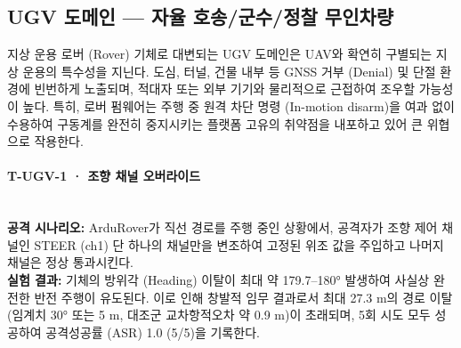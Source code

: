 \subsection{UGV 도메인 --- 자율 호송/군수/정찰 무인차량}

지상 운용 로버 (Rover) 기체로 대변되는 UGV 도메인은 UAV와 확연히 구별되는 지상 운용의 특수성을 지닌다. 도심, 터널, 건물 내부 등 GNSS 거부 (Denial) 및 단절 환경에 빈번하게 노출되며, 적대자 또는 외부 기기와 물리적으로 근접하여 조우할 가능성이 높다. 특히, 로버 펌웨어는 주행 중 원격 차단 명령 (In-motion disarm)을 여과 없이 수용하여 구동계를 완전히 중지시키는 플랫폼 고유의 취약점을 내포하고 있어 큰 위협으로 작용한다.

\paragraph{\textbf{T-UGV-1 · 조향 채널 오버라이드}} ~\\
\textbf{공격 시나리오:} ArduRover가 직선 경로를 주행 중인 상황에서, 공격자가 조향 제어 채널인 STEER (ch1) 단 하나의 채널만을 변조하여 고정된 위조 값을 주입하고 나머지 채널은 정상 통과시킨다.\\
\textbf{실험 결과:} 기체의 방위각 (Heading) 이탈이 최대 약 179.7--180° 발생하여 사실상 완전한 반전 주행이 유도된다. 이로 인해 창발적 임무 결과로서 최대 27.3 m의 경로 이탈 (임계치 30° 또는 5 m, 대조군 교차항적오차 약 0.9 m)이 초래되며, 5회 시도 모두 성공하여 공격성공률 (ASR) 1.0 (5/5)을 기록한다.\\

